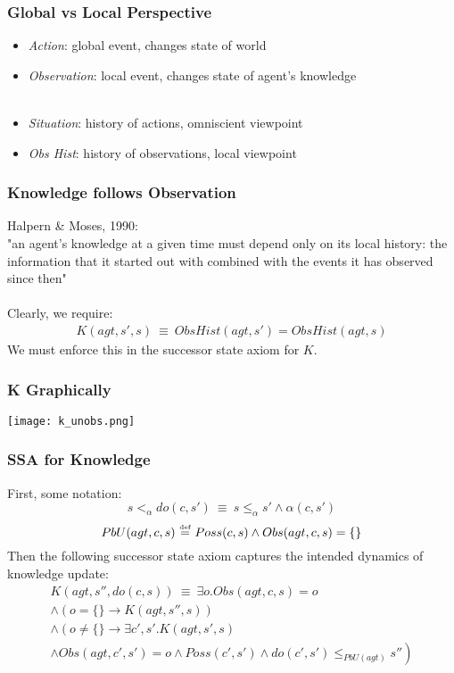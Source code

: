\documentclass{beamer}
\newcommand{\isdef}{\hbox{$\stackrel{\mbox{\tiny def}}{=}$}}
\begin{document}
\begin{frame}
\frametitle{Global vs Local Perspective}
\begin{itemize}
\item \emph{Action}: global event, changes state of world
\item \emph{Observation}: local event, changes state of agent's knowledge\\
\ \\
\item \emph{Situation}: history of actions, omniscient viewpoint
\item \emph{Obs Hist}: history of observations, local viewpoint
\end{itemize}
\end{frame}

\begin{frame}
\frametitle{Knowledge follows  Observation}
Halpern \& Moses, 1990:\\
"an agent's knowledge at a given time must depend only on its local history:
the information that it started out with combined with the events it has
observed since then"
\pause
\ \\
\ \\
Clearly, we require:
\begin{multline*}
K(agt,s',s)\ \equiv\ ObsHist(agt,s') = ObsHist(agt,s)
\end{multline*}
We must enforce this in the successor state axiom for $K$.
\end{frame}

\begin{frame}
\frametitle{K Graphically}
\begin{center}
  \texttt{[image: k\_unobs.png]}
\end{center}
\end{frame}

\begin{frame}
\frametitle{SSA for Knowledge}
First, some notation:
\begin{equation*}
  s <_{\alpha} do(c,s')\ \equiv\ s \leq_{\alpha} s' \wedge \alpha(c,s')
\end{equation*}
\begin{equation*}
  PbU(agt,c,s)\ \isdef\ Poss(c,s) \wedge Obs(agt,c,s) = \{\}
\end{equation*}
\pause
Then the following successor state axiom captures the intended dynamics of
knowledge update:
\begin{multline*}
  K(agt,s'',do(c,s))\ \equiv\ \exists o . Obs(agt,c,s) = o  \\
  \wedge \left(o = \{\} \rightarrow K(agt,s'',s)\right) \\
  \wedge \left(o \neq \{\} \rightarrow \exists c',s' . K(agt,s',s)\right. \\
  \left.\wedge Obs(agt,c',s') = o \wedge Poss(c',s') \wedge do(c',s') \leq_{PbU(agt)} s''\right)
\end{multline*}
\end{frame}
\end{document}
